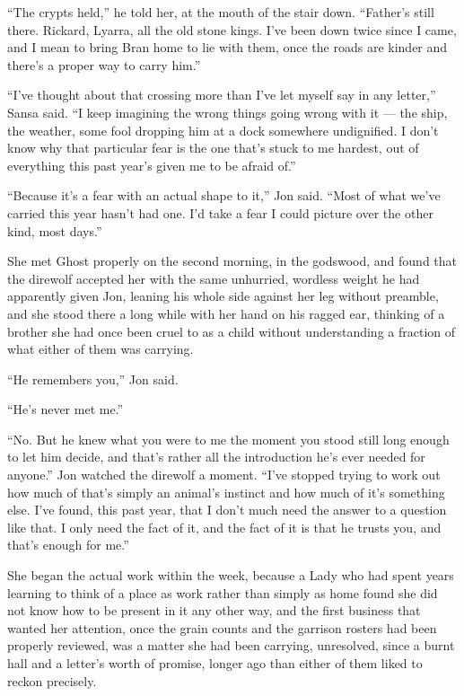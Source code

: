 “The crypts held,” he told her, at the mouth of the stair down. “Father’s still there. Rickard, Lyarra, all the old stone kings. I’ve been down twice since I came, and I mean to bring Bran home to lie with them, once the roads are kinder and there’s a proper way to carry him.”

“I’ve thought about that crossing more than I’ve let myself say in any letter,” Sansa said. “I keep imagining the wrong things going wrong with it — the ship, the weather, some fool dropping him at a dock somewhere undignified. I don’t know why that particular fear is the one that’s stuck to me hardest, out of everything this past year’s given me to be afraid of.”

“Because it’s a fear with an actual shape to it,” Jon said. “Most of what we’ve carried this year hasn’t had one. I’d take a fear I could picture over the other kind, most days.”

\sceneBreak

She met Ghost properly on the second morning, in the godswood, and found that the direwolf accepted her with the same unhurried, wordless weight he had apparently given Jon, leaning his whole side against her leg without preamble, and she stood there a long while with her hand on his ragged ear, thinking of a brother she had once been cruel to as a child without understanding a fraction of what either of them was carrying.

“He remembers you,” Jon said.

“He’s never met me.”

“No. But he knew what you were to me the moment you stood still long enough to let him decide, and that’s rather all the introduction he’s ever needed for anyone.” Jon watched the direwolf a moment. “I’ve stopped trying to work out how much of that’s simply an animal’s instinct and how much of it’s something else. I’ve found, this past year, that I don’t much need the answer to a question like that. I only need the fact of it, and the fact of it is that he trusts you, and that’s enough for me.”

\sceneBreak

She began the actual work within the week, because a Lady who had spent years learning to think of a place as work rather than simply as home found she did not know how to be present in it any other way, and the first business that wanted her attention, once the grain counts and the garrison rosters had been properly reviewed, was a matter she had been carrying, unresolved, since a burnt hall and a letter’s worth of promise, longer ago than either of them liked to reckon precisely.

